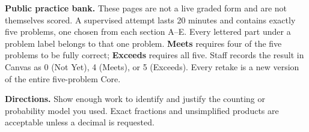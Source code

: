 \documentclass{article}
\begin{document}
\small

\textbf{Public practice bank.} These pages are not a live graded form and are
not themselves scored. A supervised attempt lasts 20 minutes and contains
exactly five problems, one chosen from each section A--E. Every lettered part
under a problem label belongs to that one problem. \textbf{Meets} requires four
of the five problems to be fully correct; \textbf{Exceeds} requires all five.
Staff records the result in Canvas as 0 (Not Yet), 4 (Meets), or 5 (Exceeds).
Every retake is a new version of the entire five-problem Core.

\textbf{Directions.} Show enough work to identify and justify the counting or
probability model you used. Exact fractions and unsimplified products are
acceptable unless a decimal is requested.





\end{document}
